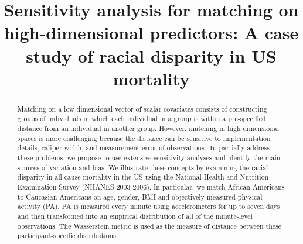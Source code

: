 
\title{Sensitivity analysis for matching on high-dimensional predictors: A case study of racial disparity in US mortality}
\maketitle

\begin{abstract}
Matching on a low dimensional vector of scalar covariates consists of constructing groups of individuals in which each individual in a group is within a pre-specified distance from an individual in another group. However, matching in high dimensional spaces is more challenging because the distance can be sensitive to implementation details, caliper width, and measurement error of observations. To partially address these problems, we propose to use extensive sensitivity analyses and identify the main sources of variation and bias. We illustrate these concepts by examining the racial disparity in all-cause mortality in the US using the National Health and Nutrition Examination Survey (NHANES 2003-2006). In particular, we match African Americans to Caucasian Americans on age, gender, BMI and objectively measured physical activity (PA). PA is measured every minute using accelerometers for up to seven days and then transformed into an empirical distribution of all of the minute-level observations. The Wasserstein metric is used as the measure of distance between these participant-specific distributions. 

   \begin{comment}


In looking to match on NHANES data, we identify four potential problems for using the Wasserstein distance in a high-dimensional setting: (1) the sensitivity to the choice of interval where the integration is conducted; (2) the sensitivity to the choice of the number of terms in the Riemann sum approximation; (3) the within-person, day-to-day variability in the measured physical activity can substantially affect the stability of Wasserstein; and (4) a lack of meaning for the values of the distances and a threshold used for the definition of closeness.

The complexities  understanding its meaning, and determining closeness pose complications.

Sensitivity analyses must be done
We found that variability in user chosen parameters led to different results- we identify key areas that lead to this 

Cautionary tale for anyone looking to do high-dimensional matching 

In particular, we formalize the problem, show that solutions will depend on a set of choices in terms of distance and calipers, and investigate the sensitivity of the results to these choices.

 and explore the impact of caliper selection, the computation of the distance, and within-person variability on the subgroups defined by matching and, consequently, on the estimators of $\exp(\gamma_1)$
\end{comment}


   
\end{abstract}

